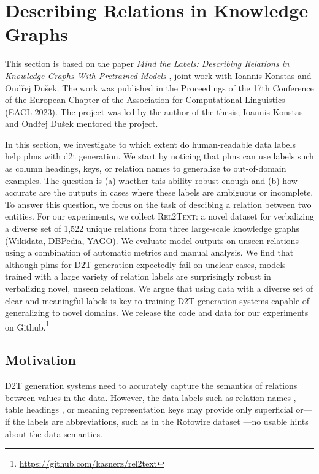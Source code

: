 \section{Describing Relations in Knowledge Graphs}
\label{sec:rel2text}
\begin{refbox}
    This section is based on the paper \emph{Mind the Labels: Describing Relations in Knowledge Graphs With Pretrained Models} \cite{kasnerMindLabelsDescribing2022}, joint work with Ioannis Konstas and Ondřej Dušek. The work was published in the Proceedings of the 17th Conference of the European Chapter of the Association for Computational Linguistics (EACL 2023). The project was led by the author of the thesis; Ioannis Konstas and Ondřej Dušek mentored the project.
\end{refbox}
In this section, we investigate to which extent do human-readable data labels help \acp{plm} with \ac{d2t} generation. We start by noticing that \acp{plm} can use labels such as column headings, keys, or relation names to generalize to out-of-domain examples. The question is (a) whether this ability robust enough and (b) how accurate are the outputs in cases where these labels are ambiguous or incomplete. To answer this question, we focus on the task of descibing a relation between two entities. For our experiments, we collect \textsc{Rel2Text}: a novel dataset for verbalizing a diverse set of 1,522 unique relations from three large-scale knowledge graphs (Wikidata, DBPedia, YAGO). We evaluate model outputs on unseen relations using a combination of automatic metrics and manual analysis. We find that although \acp{plm} for D2T generation expectedly fail on unclear cases, models trained with a large variety of relation labels are surprisingly robust in verbalizing novel, unseen relations. We argue that using data with a diverse set of clear and meaningful labels is key to training D2T generation systems capable of generalizing to novel domains. We release the code and data for our experiments on Github.\footnote{\url{https://github.com/kasnerz/rel2text}}


% 

\subsection{Motivation}
D2T generation systems need to accurately capture the semantics of relations between values in the data. However, the data labels such as relation names \cite{farber2018linked,haller2022analysis}, table headings \cite{parikhToTToControlledTableToText2020}, or meaning representation keys \cite{dusekEvaluatingStateoftheartEndtoEnd2020} may provide only superficial or---if the labels are abbreviations, such as in the Rotowire dataset \cite{wiseman2017challenges}---no usable hints about the data semantics.


